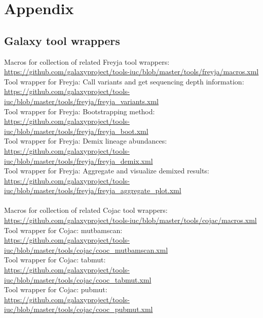 %
\section{Appendix} \label{sec:appendix}

    \subsection{Galaxy tool wrappers} \label{sec:appendix:galaxy-wrappers}
    Macros for collection of related Freyja tool wrappers: \\
    \url{https://github.com/galaxyproject/tools-iuc/blob/master/tools/freyja/macros.xml}\\
    Tool wrapper for Freyja: Call variants and get sequencing depth information: \\
    \url{https://github.com/galaxyproject/tools-iuc/blob/master/tools/freyja/freyja_variants.xml}\\
    Tool wrapper for Freyja: Bootstrapping method: \\
    \url{https://github.com/galaxyproject/tools-iuc/blob/master/tools/freyja/freyja_boot.xml}\\
    Tool wrapper for Freyja: Demix lineage abundances: \\
    \url{https://github.com/galaxyproject/tools-iuc/blob/master/tools/freyja/freyja_demix.xml}\\
    Tool wrapper for Freyja: Aggregate and visualize demixed results: \\
    \url{https://github.com/galaxyproject/tools-iuc/blob/master/tools/freyja/freyja_aggregate_plot.xml}\\
    \\
    Macros for collection of related Cojac tool wrappers: \\
    \url{https://github.com/galaxyproject/tools-iuc/blob/master/tools/cojac/macros.xml}\\
    Tool wrapper for Cojac: mutbamscan: \\
    \url{https://github.com/galaxyproject/tools-iuc/blob/master/tools/cojac/cooc_mutbamscan.xml}\\
    Tool wrapper for Cojac: tabmut: \\
    \url{https://github.com/galaxyproject/tools-iuc/blob/master/tools/cojac/cooc_tabmut.xml}\\
    Tool wrapper for Cojac: pubmut: \\
    \url{https://github.com/galaxyproject/tools-iuc/blob/master/tools/cojac/cooc_pubmut.xml}
    
